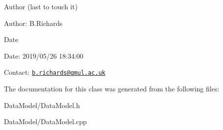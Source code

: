 \begin{DoxyAuthor}{Author}
(last to touch it) 
\end{DoxyAuthor}
\begin{DoxyParagraph}{Author\-:}
B.\-Richards 
\end{DoxyParagraph}


\begin{DoxyDate}{Date}

\end{DoxyDate}
\begin{DoxyParagraph}{Date\-:}
2019/05/26 18\-:34\-:00 
\end{DoxyParagraph}


Contact\-: \href{mailto:b.richards@qmul.ac.uk}{\tt b.\-richards@qmul.\-ac.\-uk} 

The documentation for this class was generated from the following files\-:\begin{DoxyCompactItemize}
\item 
Data\-Model/Data\-Model.\-h\item 
Data\-Model/Data\-Model.\-cpp\end{DoxyCompactItemize}
